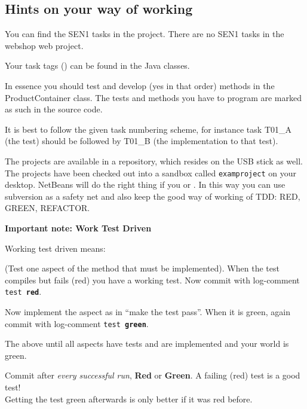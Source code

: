 \subsection{Hints on your way of working}
You can find the SEN1 tasks in the  project.
There are no SEN1 tasks in the webshop web project.

Your task tags () can be found in the Java classes. 

In essence you should test and develop (yes in that order) 
methods in the ProductContainer class. The tests and methods
you have to program are marked as such in the source code.

It is best to follow the given task numbering scheme, for instance task
T01\_A (the test) should be followed by T01\_B (the implementation
to that test).

The projects are available in a repository, which resides on the USB
stick as well. The projects have been checked out into a sandbox called
\texttt{examproject} on your desktop. NetBeans will do the right thing
if you  or . In this way you can
use subversion as a safety net and also keep the good way of working
of TDD: RED, GREEN, REFACTOR. 

\begin{center}
  {\large\bf\sffamily Important note: Work Test Driven}
\end{center}

Working test driven means:
\begin{description*}
\item [Develop a test:] (Test one aspect of the method that must be
  implemented). When the test compiles but fails (red) you have a
  working test. Now commit with  log-comment \texttt{test {\bfseries\color{BrickRed}red}}.
  
\item[Implement an aspect:] Now implement the aspect as in ``make the test
  pass''. When it is green, again commit with  log-comment
  \texttt{test {\bfseries\color{OliveGreen}green}}.
\item[Repeat:] The above until all aspects have tests and are implemented
  and your world is green.
\end{description*}

\begin{center}
  {\large\sffamily{}Commit after \textit{every successful run},  \textbf{Red} or
    \textbf{Green}. A failing (red) test is a good test!\\Getting the test green
    afterwards is only better if it was red before.}
\end{center}


